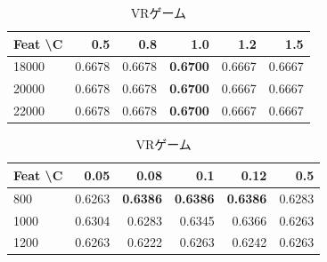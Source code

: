 \documentclass[uplatex, dvipdfmx, 11pt, a4paper, report]{jsbook}
\begin{document}
\begin{table}[H]
    \centering
    \small
    \begin{minipage}[t]{0.48\textwidth}
        \centering
        \caption{コメディー}
        \begin{tabular}{l|rrrrr}
            \hline
            Feat \textbackslash C & 0.5 & 0.8 & 1.0 & 1.2 & 1.5 \\ \hline
            18000 & 0.6678 & 0.6678 & \textbf{0.6700} & 0.6667 & 0.6667 \\
            20000 & 0.6678 & 0.6678 & \textbf{0.6700} & 0.6667 & 0.6667 \\
            22000 & 0.6678 & 0.6678 & \textbf{0.6700} & 0.6667 & 0.6667 \\ \hline
        \end{tabular}
    \end{minipage}
    \hfill
    \begin{minipage}[t]{0.48\textwidth}
        \centering
        \caption{VRゲーム}
        \begin{tabular}{l|rrrrr}
            \hline
            Feat \textbackslash C & 0.05 & 0.08 & 0.1 & 0.12 & 0.5 \\ \hline
            800 & 0.6263 & \textbf{0.6386} & \textbf{0.6386} & \textbf{0.6386} & 0.6283 \\
            1000 & 0.6304 & 0.6283 & 0.6345 & 0.6366 & 0.6263 \\
            1200 & 0.6263 & 0.6222 & 0.6263 & 0.6242 & 0.6263 \\ \hline
        \end{tabular}
    \end{minipage}
\end{table}
\end{document}
